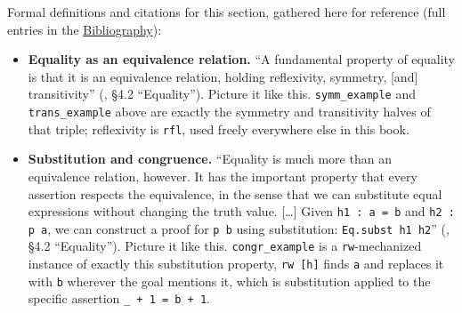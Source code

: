 Formal definitions and citations for this section, gathered here for reference (full entries in the \hyperref[sec:root:bibliography:1]{Bibliography}):

\begin{itemize}
\tightlist
\item
  \textbf{Equality as an equivalence relation.} ``A fundamental property of equality is that it is an equivalence relation, holding reflexivity, symmetry, {[}and{]} transitivity'' (\cite{TPIL4}, §4.2 ``Equality''). Picture it like this. \texttt{symm\_\allowbreak{}example} and \texttt{trans\_\allowbreak{}example} above are exactly the symmetry and transitivity halves of that triple; reflexivity is \texttt{rfl}, used freely everywhere else in this book.
\item
  \textbf{Substitution and congruence.} ``Equality is much more than an equivalence relation, however. It has the important property that every assertion respects the equivalence, in the sense that we can substitute equal expressions without changing the truth value. {[}\ldots{]} Given \texttt{h1 : a = b} and \texttt{h2 : p a}, we can construct a proof for \texttt{p b} using substitution: \texttt{Eq.subst h1 h2}'' (\cite{TPIL4}, §4.2 ``Equality''). Picture it like this. \texttt{congr\_\allowbreak{}example} is a \texttt{rw}-mechanized instance of exactly this substitution property, \texttt{rw [h]} finds \texttt{a} and replaces it with \texttt{b} wherever the goal mentions it, which is substitution applied to the specific assertion \texttt{\_\allowbreak{} + 1 = b + 1}.
\end{itemize}
